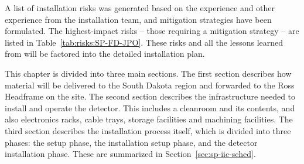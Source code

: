 A list of installation risks was generated based on the  experience and other experience from the installation team, and mitigation strategies have been formulated. 
The highest-impact risks -- those requiring a mitigation strategy -- are listed in Table~\ref{tab:risks:SP-FD-JPO}. 
These risks and all the lessons learned from  will be factored into the detailed installation plan.

This chapter is divided into three main sections. 
The first section describes how material will be delivered to the South Dakota region and forwarded to the Ross Headframe on the  site. 
The second section describes the infrastructure needed to install and operate the detector. This includes a cleanroom and its contents, and also electronics racks, cable trays, storage facilities and machining facilities. 
The third section describes the installation process itself, which is divided into three phases: the  setup phase, the installation setup phase, and the detector installation phase. These are summarized in Section~\ref{sec:sp-iic-sched}.
